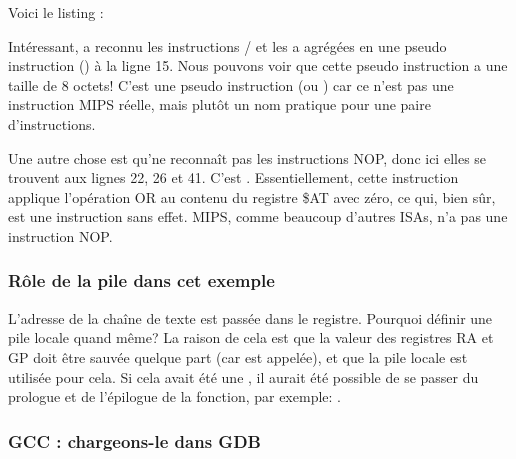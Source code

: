 Voici le listing \IDA:




Intéressant, \IDA a reconnu les instructions / et les a agrégées
en une pseudo instruction  () à la ligne 15.
Nous pouvons voir que cette pseudo instruction a une taille de 8 octets!
C'est une pseudo instruction (ou ) car ce n'est pas une instruction MIPS
réelle, mais plutôt un nom pratique pour une paire d'instructions.


Une autre chose est qu'\IDA ne reconnaît pas les instructions \ac{NOP}, donc ici
elles se trouvent aux lignes 22, 26 et 41.
C'est .
Essentiellement, cette instruction applique l'opération OR au contenu du registre
\$AT avec zéro, ce qui, bien sûr, est une instruction sans effet.
MIPS, comme beaucoup d'autres \ac{ISA}s, n'a pas une instruction \ac{NOP}.

\subsubsection{Rôle de la pile dans cet exemple}

L'adresse de la chaîne de texte est passée dans le registre.
Pourquoi définir une pile locale quand même?
La raison de cela est que la valeur des registres \ac{RA} et GP doit être sauvée
quelque part (car \printf est appelée), et que la pile locale est utilisée pour cela.
Si cela avait été une , il aurait été
possible de se passer du prologue et de l'épilogue de la fonction, par
exemple: .

\subsubsection{GCC \Optimizing: chargeons-le dans GDB}



